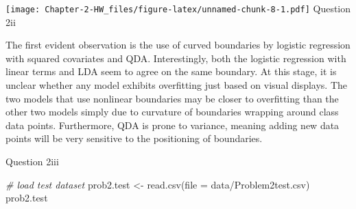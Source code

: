 \documentclass[
]{article}
\newenvironment{Shaded}{\begin{snugshade}}{\end{snugshade}}
\newcommand{\AttributeTok}[1]{\textcolor[rgb]{0.77,0.63,0.00}{#1}}
\newcommand{\CommentTok}[1]{\textcolor[rgb]{0.56,0.35,0.01}{\textit{#1}}}
\newcommand{\FunctionTok}[1]{\textcolor[rgb]{0.00,0.00,0.00}{#1}}
\newcommand{\NormalTok}[1]{#1}
\newcommand{\OtherTok}[1]{\textcolor[rgb]{0.56,0.35,0.01}{#1}}
\newcommand{\StringTok}[1]{\textcolor[rgb]{0.31,0.60,0.02}{#1}}
\begin{document}
\texttt{[image: Chapter-2-HW\_files/figure-latex/unnamed-chunk-8-1.pdf]}
Question 2ii

The first evident observation is the use of curved boundaries by
logistic regression with squared covariates and QDA. Interestingly, both
the logistic regression with linear terms and LDA seem to agree on the
same boundary. At this stage, it is unclear whether any model exhibits
overfitting just based on visual displays. The two models that use
nonlinear boundaries may be closer to overfitting than the other two
models simply due to curvature of boundaries wrapping around class data
points. Furthermore, QDA is prone to variance, meaning adding new data
points will be very sensitive to the positioning of boundaries.

Question 2iii

\begin{Shaded}
\begin{Highlighting}[]
\CommentTok{\# load test dataset}
\NormalTok{prob2.test }\OtherTok{\textless{}{-}} \FunctionTok{read.csv}\NormalTok{(}\AttributeTok{file =} \StringTok{\textquotesingle{}data/Problem2test.csv\textquotesingle{}}\NormalTok{)}
\NormalTok{prob2.test}
\end{Highlighting}
\end{Shaded}
\end{document}

